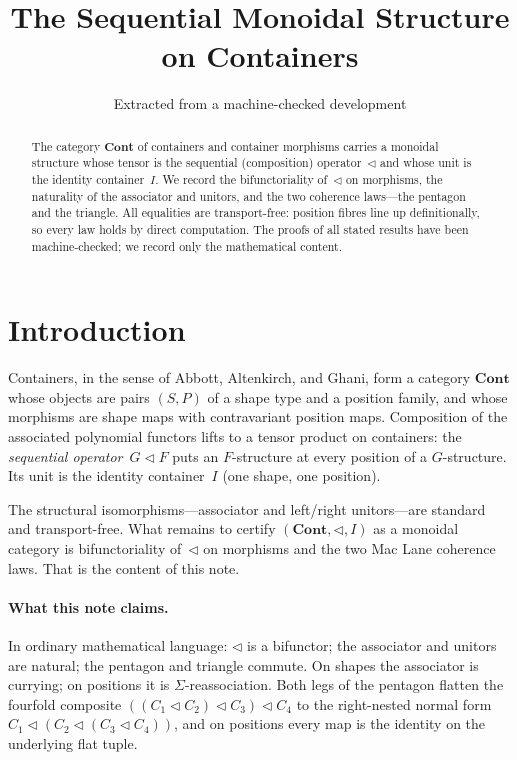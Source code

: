 \documentclass[11pt,a4paper]{article}
\title{The Sequential Monoidal Structure on Containers}
\author{Extracted from a machine-checked development}
\date{}
\theoremstyle{plain}
\theoremstyle{definition}
\newcommand{\Cont}{\mathbf{Cont}}
\newcommand{\seq}{\mathbin{\triangleleft}}
\begin{document}
\maketitle

\begin{abstract}
The category $\Cont$ of containers and container morphisms carries a
monoidal structure whose tensor is the sequential (composition)
operator~$\seq$ and whose unit is the identity container~$I$. We record
the bifunctoriality of~$\seq$ on morphisms, the naturality of the
associator and unitors, and the two coherence laws---the pentagon and the
triangle. All equalities are transport-free: position fibres line up
definitionally, so every law holds by direct computation. The proofs of
all stated results have been machine-checked; we record only the
mathematical content.
\end{abstract}

\tableofcontents
\bigskip

\section{Introduction}

Containers, in the sense of Abbott, Altenkirch, and Ghani, form a
category $\Cont$ whose objects are pairs $(S,P)$ of a shape type and a
position family, and whose morphisms are shape maps with contravariant
position maps. Composition of the associated polynomial functors lifts to
a tensor product on containers: the \emph{sequential operator}~$G \seq F$
puts an $F$-structure at every position of a $G$-structure. Its unit is
the identity container~$I$ (one shape, one position).

The structural isomorphisms---associator and left/right unitors---are
standard and transport-free. What remains to certify $(\Cont, \seq, I)$
as a monoidal category is bifunctoriality of~$\seq$ on morphisms and the
two Mac Lane coherence laws. That is the content of this note.

\paragraph{What this note claims.}
In ordinary mathematical language: $\seq$ is a bifunctor; the associator
and unitors are natural; the pentagon and triangle commute. On shapes the
associator is currying; on positions it is $\Sigma$-reassociation. Both
legs of the pentagon flatten the fourfold composite
$((C_1 \seq C_2) \seq C_3) \seq C_4$ to the right-nested normal form
$C_1 \seq (C_2 \seq (C_3 \seq C_4))$, and on positions every map is the
identity on the underlying flat tuple.
\end{document}
